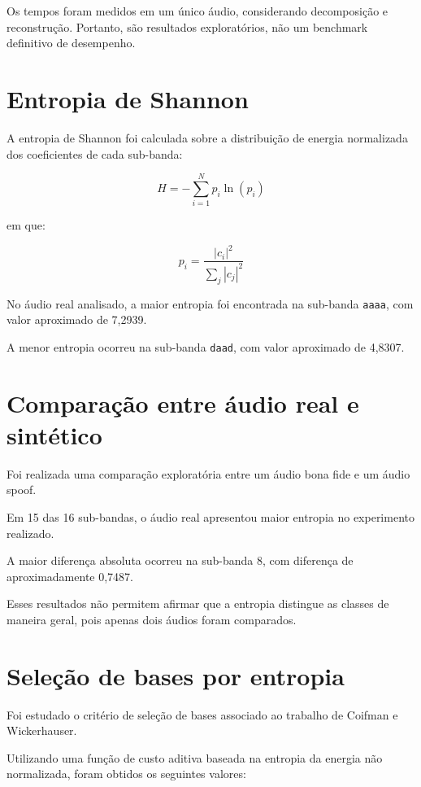 \documentclass[12pt,a4paper]{article}
\begin{document}
Os tempos foram medidos em um único áudio,
considerando decomposição e reconstrução.
Portanto, são resultados exploratórios,
não um benchmark definitivo de desempenho.

\section{Entropia de Shannon}

A entropia de Shannon foi calculada sobre a
distribuição de energia normalizada dos
coeficientes de cada sub-banda:

\begin{equation}
H = -\sum_{i=1}^{N} p_i \ln(p_i)
\end{equation}

em que:

\begin{equation}
p_i = \frac{|c_i|^2}{\sum_j |c_j|^2}
\end{equation}

No áudio real analisado, a maior entropia
foi encontrada na sub-banda \texttt{aaaa},
com valor aproximado de 7,2939.

A menor entropia ocorreu na sub-banda
\texttt{daad}, com valor aproximado de 4,8307.

\section{Comparação entre áudio real e sintético}

Foi realizada uma comparação exploratória
entre um áudio bona fide e um áudio spoof.

Em 15 das 16 sub-bandas, o áudio real apresentou
maior entropia no experimento realizado.

A maior diferença absoluta ocorreu na sub-banda
8, com diferença de aproximadamente 0,7487.

Esses resultados não permitem afirmar que a
entropia distingue as classes de maneira geral,
pois apenas dois áudios foram comparados.

\section{Seleção de bases por entropia}

Foi estudado o critério de seleção de bases
associado ao trabalho de Coifman e Wickerhauser.

Utilizando uma função de custo aditiva baseada
na entropia da energia não normalizada, foram
obtidos os seguintes valores:
\end{document}
